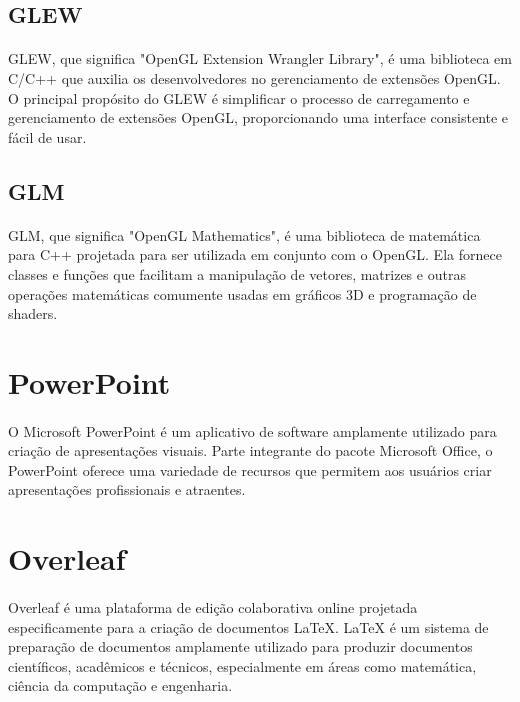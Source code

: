 \documentclass[12pt,a4paper]{memoir}
\begin{document}
\subsection{GLEW}
\label{chap2:sec:glew}
\paragraph{}
GLEW, que significa "OpenGL Extension Wrangler Library", é uma biblioteca em C/C++ que auxilia os desenvolvedores no gerenciamento de extensões OpenGL. O principal propósito do GLEW é simplificar o processo de carregamento e gerenciamento de extensões OpenGL, proporcionando uma interface consistente e fácil de usar.

\subsection{GLM}
\label{chap2:sec:glm}
\paragraph{}
GLM, que significa "OpenGL Mathematics", é uma biblioteca de matemática para C++ projetada para ser utilizada em conjunto com o OpenGL. Ela fornece classes e funções que facilitam a manipulação de vetores, matrizes e outras operações matemáticas comumente usadas em gráficos 3D e programação de shaders.

\section{PowerPoint}
\label{chap2:sec:powerpoint}
\paragraph{}
O Microsoft PowerPoint é um aplicativo de software amplamente utilizado para criação de apresentações visuais. Parte integrante do pacote Microsoft Office, o PowerPoint oferece uma variedade de recursos que permitem aos usuários criar apresentações profissionais e atraentes.

\section{Overleaf}
\label{chap2:sec:overleaf}
\paragraph{}
Overleaf é uma plataforma de edição colaborativa online projetada especificamente para a criação de documentos LaTeX. LaTeX é um sistema de preparação de documentos amplamente utilizado para produzir documentos científicos, acadêmicos e técnicos, especialmente em áreas como matemática, ciência da computação e engenharia.
\end{document}
